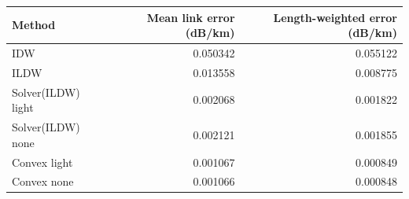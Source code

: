 \begin{tabular}{lrr}\toprule
Method & Mean link error (dB/km) & Length-weighted error (dB/km) \\ \midrule
IDW & 0.050342 & 0.055122 \\
ILDW & 0.013558 & 0.008775 \\
Solver(ILDW) light & 0.002068 & 0.001822 \\
Solver(ILDW) none & 0.002121 & 0.001855 \\
Convex light & 0.001067 & 0.000849 \\
Convex none & 0.001066 & 0.000848 \\
\bottomrule\end{tabular}
